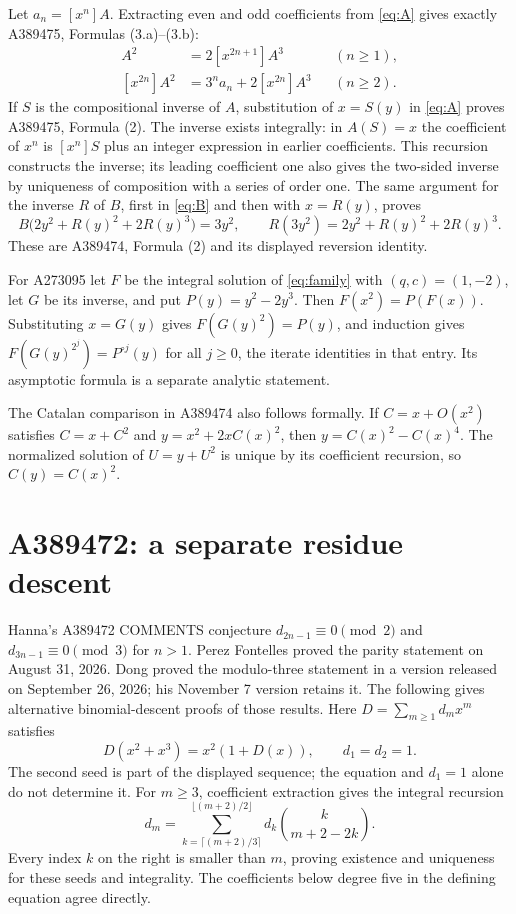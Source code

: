 \documentclass[11pt]{article}
\newcommand{\coef}[2]{[x^{#1}]#2}
\begin{document}
Let $a_n=\coef nA$. Extracting even and odd coefficients from
\eqref{eq:A} gives exactly A389475, Formulas (3.a)--(3.b):
\begin{align*}
 \coef{2n+1}{A^2}&=2\coef{2n+1}{A^3} &&(n\geq1),\\
 \coef{2n}{A^2}&=3^n a_n+2\coef{2n}{A^3} &&(n\geq2).
\end{align*}
If $S$ is the compositional inverse of $A$, substitution of $x=S(y)$
in \eqref{eq:A} proves A389475, Formula (2).
The inverse exists integrally: in $A(S)=x$ the coefficient of $x^n$
is $\coef nS$ plus an integer expression in earlier coefficients.
This recursion constructs the inverse; its leading coefficient one also
gives the two-sided inverse by uniqueness of composition with a series
of order one. The same argument for the inverse $R$ of $B$, first in
\eqref{eq:B} and then with $x=R(y)$, proves
\[
 B\bigl(2y^2+R(y)^2+2R(y)^3\bigr)=3y^2,\qquad
 R(3y^2)=2y^2+R(y)^2+2R(y)^3.
\]
These are A389474, Formula (2) and its displayed reversion identity.

For A273095 let $F$ be the integral solution of \eqref{eq:family} with
$(q,c)=(1,-2)$, let $G$ be its inverse, and put $P(y)=y^2-2y^3$.
Then $F(x^2)=P(F(x))$. Substituting $x=G(y)$ gives
$F(G(y)^2)=P(y)$, and induction gives
$F(G(y)^{2^j})=P^{\circ j}(y)$ for all $j\geq0$, the iterate identities
in that entry. Its asymptotic formula is a separate analytic statement.

The Catalan comparison in A389474 also follows formally. If
$C=x+O(x^2)$ satisfies $C=x+C^2$ and $y=x^2+2xC(x)^2$, then
$y=C(x)^2-C(x)^4$. The normalized solution of $U=y+U^2$ is unique
by its coefficient recursion, so $C(y)=C(x)^2$.

\section{A389472: a separate residue descent}

Hanna's A389472 COMMENTS \cite{hanna472} conjecture
$d_{2n-1}\equiv0\pmod2$ and $d_{3n-1}\equiv0\pmod3$ for $n>1$.
Perez Fontelles \cite[Section 4]{perez} proved the parity statement on
August 31, 2026. Dong \cite[Section 3, Theorem 4]{dong} proved the
modulo-three statement in a version released on September 26, 2026;
his November 7 version retains it. The following gives alternative
binomial-descent proofs of those results.
Here $D=\sum_{m\geq1}d_mx^m$ satisfies
\[
 D(x^2+x^3)=x^2(1+D(x)),\qquad d_1=d_2=1.
\]
The second seed is part of the displayed sequence; the equation and
$d_1=1$ alone do not determine it.
For $m\geq3$, coefficient extraction gives the integral recursion
\begin{equation}\label{eq:recurrence}
 d_m=\sum_{k=\lceil(m+2)/3\rceil}^{\lfloor(m+2)/2\rfloor}
       d_k\binom{k}{m+2-2k}.
\end{equation}
Every index $k$ on the right is smaller than $m$, proving existence and
uniqueness for these seeds and integrality. The coefficients below degree
five in the defining equation agree directly.
\end{document}
